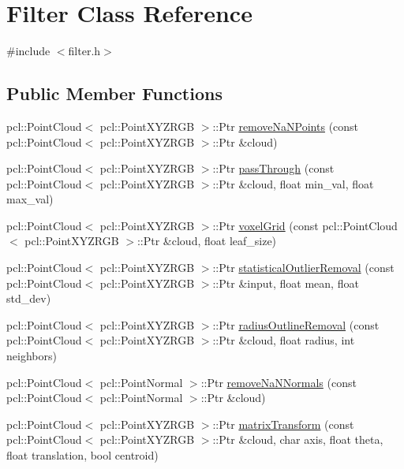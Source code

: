 \hypertarget{class_filter}{}\section{Filter Class Reference}
\label{class_filter}


{\ttfamily \#include $<$filter.\+h$>$}

\subsection*{Public Member Functions}
\begin{DoxyCompactItemize}
\item 
pcl\+::\+Point\+Cloud$<$ pcl\+::\+Point\+X\+Y\+Z\+R\+GB $>$\+::Ptr \hyperlink{class_filter_aeb13a40d687d3ceec3c01510b49855ac}{remove\+Na\+N\+Points} (const pcl\+::\+Point\+Cloud$<$ pcl\+::\+Point\+X\+Y\+Z\+R\+GB $>$\+::Ptr \&cloud)
\item 
pcl\+::\+Point\+Cloud$<$ pcl\+::\+Point\+X\+Y\+Z\+R\+GB $>$\+::Ptr \hyperlink{class_filter_a603911357de3e32f0c814c9a9689d406}{pass\+Through} (const pcl\+::\+Point\+Cloud$<$ pcl\+::\+Point\+X\+Y\+Z\+R\+GB $>$\+::Ptr \&cloud, float min\+\_\+val, float max\+\_\+val)
\item 
pcl\+::\+Point\+Cloud$<$ pcl\+::\+Point\+X\+Y\+Z\+R\+GB $>$\+::Ptr \hyperlink{class_filter_a155048b6fa5dc91ad788250657a54df4}{voxel\+Grid} (const pcl\+::\+Point\+Cloud$<$ pcl\+::\+Point\+X\+Y\+Z\+R\+GB $>$\+::Ptr \&cloud, float leaf\+\_\+size)
\item 
pcl\+::\+Point\+Cloud$<$ pcl\+::\+Point\+X\+Y\+Z\+R\+GB $>$\+::Ptr \hyperlink{class_filter_ad73a60fc35775b86e962f7dcbfc1ef72}{statistical\+Outlier\+Removal} (const pcl\+::\+Point\+Cloud$<$ pcl\+::\+Point\+X\+Y\+Z\+R\+GB $>$\+::Ptr \&input, float mean, float std\+\_\+dev)
\item 
pcl\+::\+Point\+Cloud$<$ pcl\+::\+Point\+X\+Y\+Z\+R\+GB $>$\+::Ptr \hyperlink{class_filter_a9137377eaf1376a85a48d30b9caa7c7e}{radius\+Outline\+Removal} (const pcl\+::\+Point\+Cloud$<$ pcl\+::\+Point\+X\+Y\+Z\+R\+GB $>$\+::Ptr \&cloud, float radius, int neighbors)
\item 
pcl\+::\+Point\+Cloud$<$ pcl\+::\+Point\+Normal $>$\+::Ptr \hyperlink{class_filter_a1cab4817dc8a590cc64e11b1e9d24d0b}{remove\+Na\+N\+Normals} (const pcl\+::\+Point\+Cloud$<$ pcl\+::\+Point\+Normal $>$\+::Ptr \&cloud)
\item 
pcl\+::\+Point\+Cloud$<$ pcl\+::\+Point\+X\+Y\+Z\+R\+GB $>$\+::Ptr \hyperlink{class_filter_aee0b09a09d224bd602892fcbf372d32f}{matrix\+Transform} (const pcl\+::\+Point\+Cloud$<$ pcl\+::\+Point\+X\+Y\+Z\+R\+GB $>$\+::Ptr \&cloud, char axis, float theta, float translation, bool centroid)

\end{DoxyCompactItemize}

